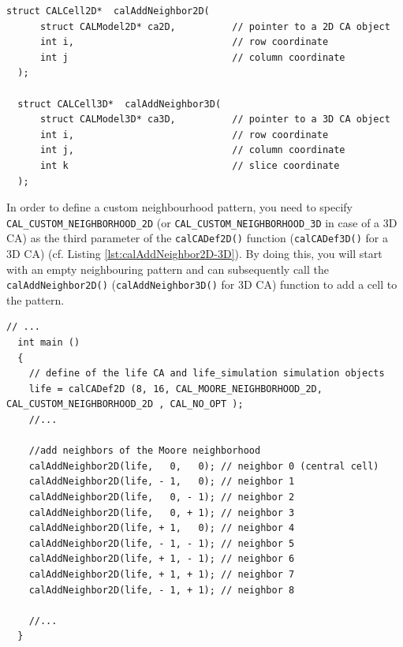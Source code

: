 \begin{lstlisting}[float,floatplacement=H, label=lst:calAddNeighbor2D-3D, caption=The calAddNeighbor2D() and calAddNeighbor3D() functions to define custom neighbourhood patterns., numbers=none]
  struct CALCell2D*  calAddNeighbor2D(
      struct CALModel2D* ca2D,          // pointer to a 2D CA object
      int i,                            // row coordinate
      int j                             // column coordinate
  );

  struct CALCell3D*  calAddNeighbor3D(
      struct CALModel3D* ca3D,          // pointer to a 3D CA object
      int i,                            // row coordinate
      int j,                            // column coordinate
      int k                             // slice coordinate
  );
\end{lstlisting}


In order to define a custom neighbourhood pattern, you need to specify
\verb'CAL_CUSTOM_NEIGHBORHOOD_2D' (or
\verb'CAL_CUSTOM_NEIGHBORHOOD_3D' in case of a 3D CA) as the third
parameter of the \verb'calCADef2D()' function (\verb'calCADef3D()' for
a 3D CA) (cf. Listing \ref{lst:calAddNeighbor2D-3D}). By doing this,
you will start with an empty neighbouring pattern and can subsequently
call the \verb'calAddNeighbor2D()' (\verb'calAddNeighbor3D()' for 3D
CA) function to add a cell to the pattern.

\begin{lstlisting}[float,floatplacement=H, label=lst:CustomMooreExample, caption=Example of custom neighbourhood pattern; the sequence of calls to the calAddNeighbor2D() function defines the Moore neighbourhood for the Game of Life CA., numbers=none]
  // ...
  int main ()
  {
    // define of the life CA and life_simulation simulation objects
    life = calCADef2D (8, 16, CAL_MOORE_NEIGHBORHOOD_2D, CAL_CUSTOM_NEIGHBORHOOD_2D , CAL_NO_OPT );
    //...
    
    //add neighbors of the Moore neighborhood
    calAddNeighbor2D(life,   0,   0); // neighbor 0 (central cell)
    calAddNeighbor2D(life, - 1,   0); // neighbor 1
    calAddNeighbor2D(life,   0, - 1); // neighbor 2
    calAddNeighbor2D(life,   0, + 1); // neighbor 3
    calAddNeighbor2D(life, + 1,   0); // neighbor 4
    calAddNeighbor2D(life, - 1, - 1); // neighbor 5
    calAddNeighbor2D(life, + 1, - 1); // neighbor 6
    calAddNeighbor2D(life, + 1, + 1); // neighbor 7
    calAddNeighbor2D(life, - 1, + 1); // neighbor 8

    //...
  }
\end{lstlisting}

